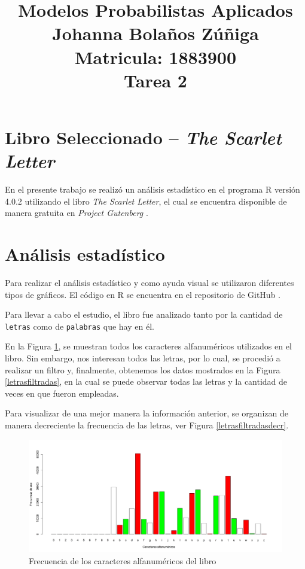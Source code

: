 \documentclass[fontsize=12pt]{article}
\title{
\centering
Modelos Probabilistas Aplicados \\
Johanna Bolaños Zúñiga \\
Matricula: 1883900\\
Tarea 2
}
\date{}
\begin{document}
\maketitle

\section{Libro Seleccionado -- \textit{The Scarlet Letter}}

En el presente trabajo se realizó un análisis estadístico en el programa R versión 4.0.2 \cite{r} utilizando el libro \textit{The Scarlet Letter}, el cual se encuentra disponible de manera gratuita en \textit{Project Gutenberg} \cite{libro}.

\section{Análisis estadístico}
Para realizar el análisis estadístico y como ayuda visual se utilizaron diferentes tipos de gráficos. El código en R se encuentra en el repositorio de GitHub \cite{github}. 

Para llevar a cabo el estudio, el libro fue analizado tanto por la cantidad de \texttt{letras} como de \texttt{palabras} que hay en él.

En la Figura \ref{letras}, se muestran todos los caracteres alfanuméricos utilizados en el libro. Sin embargo, nos interesan todos las letras, por lo cual, se procedió a realizar un filtro y, finalmente, obtenemos los datos mostrados en la Figura \ref{letrasfiltradas}, en la cual se puede observar todas las letras y la cantidad de veces en que fueron empleadas. 

Para visualizar de una mejor manera la información anterior, se organizan de manera decreciente la frecuencia de las letras, ver Figura \ref{letrasfiltradasdecr}. 

\begin{figure}
\centering
\includegraphics[scale=0.45]{Figures/letrasEnElTexto.png}
\caption{Frecuencia de los caracteres alfanuméricos del libro}
\label{letras}
\end{figure}
\end{document}
